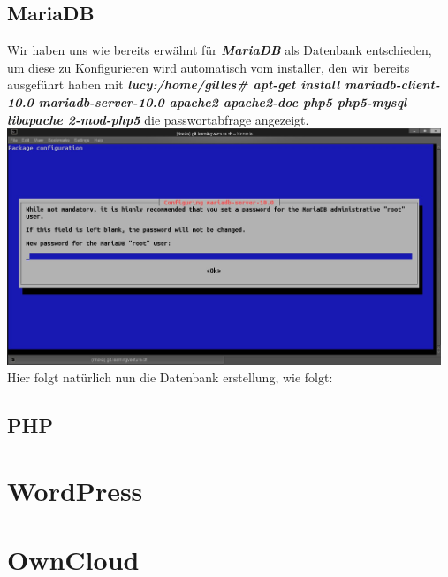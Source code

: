 \documentclass{article}
\begin{document}
	\subsection{MariaDB}
	Wir haben uns wie bereits erwähnt für \textit{\textbf{MariaDB}}  als Datenbank entschieden, um diese zu Konfigurieren wird automatisch vom installer, den wir bereits ausgeführt haben mit \textit{\textbf{lucy:/home/gilles\# apt-get install mariadb-client-10.0 mariadb-server-10.0 apache2 apache2-doc php5 php5-mysql libapache 2-mod-php5}} die passwortabfrage angezeigt.
	\newline
	\newline
	\includegraphics[width=13cm]{../Pics/3-lamp-stack-mariadb}
	\newline
	\newline
	Hier folgt natürlich nun die Datenbank erstellung, wie folgt:
	\subsection{PHP}
	\section{WordPress}
	\section{OwnCloud}
\end{document}
